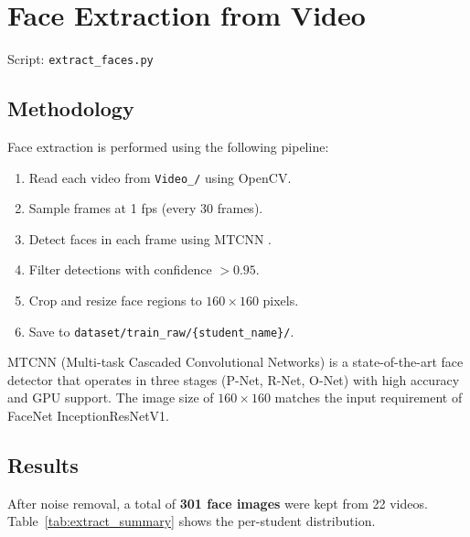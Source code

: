 \documentclass[12pt,a4paper]{article}
\begin{document}
\newpage

\section{Face Extraction from Video}
\label{sec:extract}

Script: \texttt{extract\_faces.py}

\subsection{Methodology}
\label{subsec:extract_method}

Face extraction is performed using the following pipeline:
\begin{enumerate}
    \item Read each video from \texttt{Video\_/} using OpenCV.
    \item Sample frames at 1 fps (every 30 frames).
    \item Detect faces in each frame using MTCNN \cite{mtcnn}.
    \item Filter detections with confidence $> 0.95$.
    \item Crop and resize face regions to $160 \times 160$ pixels.
    \item Save to \texttt{dataset/train\_raw/\{student\_name\}/}.
\end{enumerate}

MTCNN (Multi-task Cascaded Convolutional Networks) is a state-of-the-art face detector that operates in three stages (P-Net, R-Net, O-Net) with high accuracy and GPU support. The image size of $160 \times 160$ matches the input requirement of FaceNet InceptionResNetV1.

\subsection{Results}
\label{subsec:extract_results}

After noise removal, a total of \textbf{301 face images} were kept from 22 videos. Table~\ref{tab:extract_summary} shows the per-student distribution.
\end{document}

